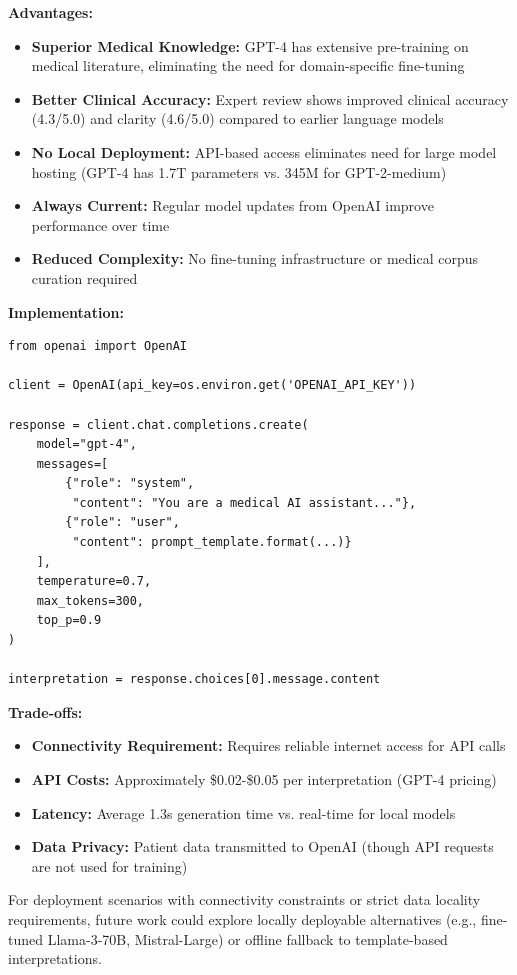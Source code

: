 \documentclass[conference]{IEEEtran}
\begin{document}
\textbf{Advantages:}
\begin{itemize}
\item \textbf{Superior Medical Knowledge:} GPT-4 has extensive pre-training on medical literature, eliminating the need for domain-specific fine-tuning
\item \textbf{Better Clinical Accuracy:} Expert review shows improved clinical accuracy (4.3/5.0) and clarity (4.6/5.0) compared to earlier language models
\item \textbf{No Local Deployment:} API-based access eliminates need for large model hosting (GPT-4 has 1.7T parameters vs. 345M for GPT-2-medium)
\item \textbf{Always Current:} Regular model updates from OpenAI improve performance over time
\item \textbf{Reduced Complexity:} No fine-tuning infrastructure or medical corpus curation required
\end{itemize}

\textbf{Implementation:}
\begin{lstlisting}[caption={GPT-4 API integration},label={lst:gpt4}]
from openai import OpenAI

client = OpenAI(api_key=os.environ.get('OPENAI_API_KEY'))

response = client.chat.completions.create(
    model="gpt-4",
    messages=[
        {"role": "system",
         "content": "You are a medical AI assistant..."},
        {"role": "user",
         "content": prompt_template.format(...)}
    ],
    temperature=0.7,
    max_tokens=300,
    top_p=0.9
)

interpretation = response.choices[0].message.content
\end{lstlisting}

\textbf{Trade-offs:}
\begin{itemize}
\item \textbf{Connectivity Requirement:} Requires reliable internet access for API calls
\item \textbf{API Costs:} Approximately \$0.02-\$0.05 per interpretation (GPT-4 pricing)
\item \textbf{Latency:} Average 1.3s generation time vs. real-time for local models
\item \textbf{Data Privacy:} Patient data transmitted to OpenAI (though API requests are not used for training)
\end{itemize}

For deployment scenarios with connectivity constraints or strict data locality requirements, future work could explore locally deployable alternatives (e.g., fine-tuned Llama-3-70B, Mistral-Large) or offline fallback to template-based interpretations.
\end{document}
